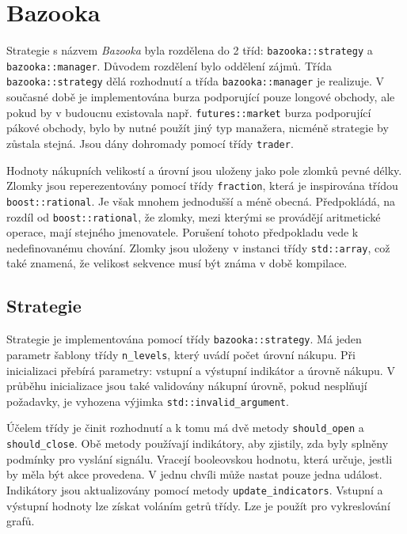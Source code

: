 \section{Bazooka}
Strategie s názvem \textit{Bazooka} byla rozdělena do 2 tříd: \texttt{bazooka::strategy} a \texttt{bazooka::manager}.
Důvodem rozdělení bylo oddělení zájmů.
Třída \texttt{bazooka::strategy} dělá rozhodnutí a třída \texttt{bazooka::manager} je realizuje.
V současné době je implementována burza podporující pouze longové obchody, ale pokud by v budoucnu existovala např. \texttt{futures::market} burza podporující pákové obchody, bylo by nutné použít jiný typ manažera, nicméně strategie by zůstala stejná.
Jsou dány dohromady pomocí třídy \texttt{trader}.

Hodnoty nákupních velikostí a úrovní jsou uloženy jako pole zlomků pevné délky.
Zlomky jsou reperezentovány pomocí třídy \texttt{fraction}, která je inspirována třídou \texttt{boost::rational}.
Je však mnohem jednodušší a méně obecná.
Předpokládá, na rozdíl od \texttt{boost::rational}, že zlomky, mezi kterými se provádějí aritmetické operace, mají stejného jmenovatele.
Porušení tohoto předpokladu vede k nedefinovanému chování.
Zlomky jsou uloženy v instanci třídy \texttt{std::array}, což také znamená, že velikost sekvence musí být známa v době kompilace.

\subsection{Strategie}
Strategie je implementována pomocí třídy \texttt{bazooka::strategy}.
Má jeden parametr šablony třídy \texttt{n\_levels}, který uvádí počet úrovní nákupu.
Při inicializaci přebírá parametry: vstupní a výstupní indikátor a úrovně nákupu.
V průběhu inicializace jsou také validovány nákupní úrovně, pokud nesplňují požadavky, je vyhozena výjimka \texttt{std::invalid\_argument}.

Účelem třídy je činit rozhodnutí a k tomu má dvě metody \texttt{should\_open} a \texttt{should\_close}.
Obě metody používají indikátory, aby zjistily, zda byly splněny podmínky pro vyslání signálu.
Vracejí booleovskou hodnotu, která určuje, jestli by měla být akce provedena.
V jednu chvíli může nastat pouze jedna událost.
Indikátory jsou aktualizovány pomocí metody \texttt{update\_indicators}.
Vstupní a výstupní hodnoty lze získat voláním getrů třídy.
Lze je použít pro vykreslování grafů.

